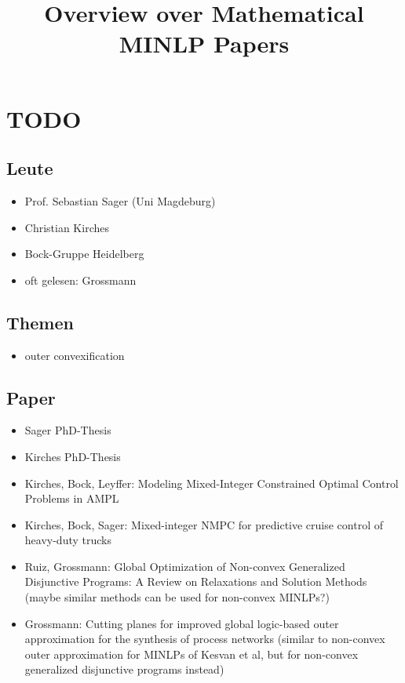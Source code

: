 \documentclass{article}
\title{\textbf{Overview over Mathematical MINLP Papers}}
\date{}
\begin{document}
\maketitle
\tableofcontents

\newpage

\section{TODO}
\subsection{Leute}
\begin{itemize}
\item Prof. Sebastian Sager (Uni Magdeburg)
\item Christian Kirches
\item Bock-Gruppe Heidelberg
\item oft gelesen: Grossmann
\end{itemize}
\subsection{Themen}
\begin{itemize}
\item outer convexification
\end{itemize}
\subsection{Paper}
\begin{itemize}
\item Sager PhD-Thesis
\item Kirches PhD-Thesis
\item Kirches, Bock, Leyffer: Modeling Mixed-Integer Constrained
Optimal Control Problems in AMPL
\item Kirches, Bock, Sager: Mixed-integer NMPC for predictive cruise control of heavy-duty trucks
\item Ruiz, Grossmann: Global Optimization of Non-convex Generalized
Disjunctive Programs: A Review on Relaxations and Solution Methods (maybe similar methods can be used for non-convex MINLPs?)
\item Grossmann: Cutting planes for improved global logic-based outer approximation
for the synthesis of process networks (similar to non-convex outer approximation for MINLPs of Kesvan et al, but for non-convex generalized disjunctive programs instead)
\end{itemize}
\end{document}

